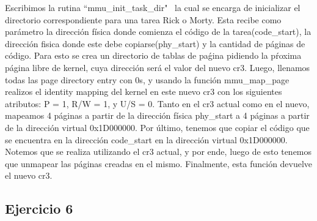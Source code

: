\documentclass[a4paper]{article}
\begin{document}
\justify
Escribimos la rutina ``mmu_init_task_dir" \, la cual se encarga de inicializar el directorio correspondiente para una tarea Rick o Morty. Esta recibe como parámetro la dirección física donde comienza el código de la tarea(code_start), la dirección fisica donde este debe copiarse(phy_start) y la cantidad de páginas de código.
Para esto se crea un directorio de tablas de paǵina pidiendo la pŕoxima página libre de kernel, cuya dirección será el valor del nuevo cr3. Luego, llenamos todas las page directory entry con 0s, y usando la función mmu_map_page realizos el identity mapping del kernel en este nuevo cr3 con los siguientes atributos: P = 1, R/W = 1, y U/S = 0. Tanto en el cr3 actual como en el nuevo, mapeamos 4 páginas a partir de la dirección física phy_start a 4 páginas a partir de la dirección virtual 0x1D000000. Por último, tenemos que copiar el código que se encuentra en la dirección code_start en la dirección virtual 0x1D000000. Notemos que se realiza utilizando el cr3 actual, y por ende, luego de esto tenemos que unmapear las páginas creadas en el mismo. Finalmente, esta función devuelve el nuevo cr3.
 


\subsection{Ejercicio 6}
\end{document}
